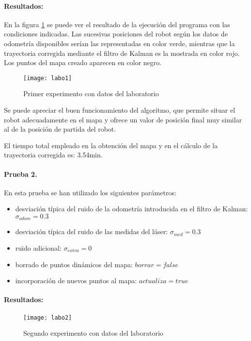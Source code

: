 \paragraph{Resultados:}

En la figura \ref{fg:labo1} se puede ver el resultado de la ejecución del programa con las condiciones indicadas. Las sucesivas posiciones del robot según los datos de odometría disponibles serían las representadas en color verde, mientras que la trayectoria corregida mediante el filtro de Kalman es la mostrada en color rojo. Los puntos del mapa creado aparecen en color negro.

\begin{figure}[h]
  \centering\texttt{[image: labo1]}\\
  \caption{Primer experimento con datos del laboratorio}\label{fg:labo1}
\end{figure}

Se puede apreciar el buen funcionamiento del algoritmo, que permite situar el robot adecuadamente en el mapa y ofrece un valor de posición final muy similar al de la posición de partida del robot.

El tiempo total empleado en la obtención del mapa y en el cálculo de la trayectoria corregida es: 3.54min.

\paragraph{Prueba 2.}
En esta prueba se han utilizado los siguientes parámetros:
\begin{itemize}
  \item desviación típica del ruido de la odometría introducida en el filtro de Kalman: $\sigma_{odom} = 0.3$
  \item desviación típica del ruido de las medidas del láser: $\sigma_{med} = 0.3$
  \item ruido adicional: $\sigma_{extra} = 0$
  \item borrado de puntos dinámicos del mapa: $borrar = false$
  \item incorporación de nuevos puntos al mapa: $actualiza = true$
\end{itemize}


\paragraph{Resultados:}

\begin{figure}[h]
  \centering\texttt{[image: labo2]}\\
  \caption{Segundo experimento con datos del laboratorio}\label{fg:labo2}
\end{figure}

